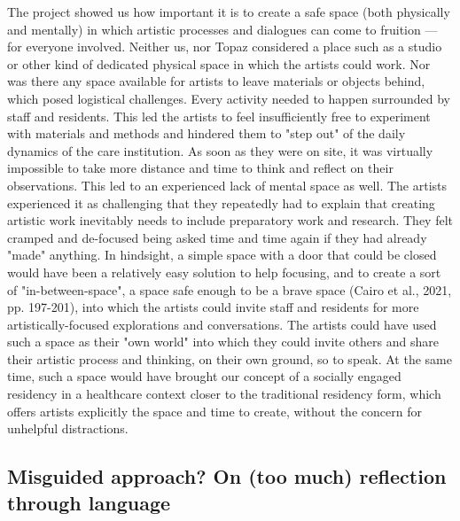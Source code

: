 \documentclass[authordate, empirical]{jote-new-article}
\begin{document}
	The project showed us how important it is to create a safe space (both physically and mentally) in which artistic processes and dialogues can come to fruition --- for everyone involved. Neither us, nor Topaz considered a place such as a studio or other kind of dedicated physical space in which the artists could work. Nor was there any space available for artists to leave materials or objects behind, which posed logistical challenges. Every activity needed to happen surrounded by staff and residents. This led the artists to feel insufficiently free to experiment with materials and methods and hindered them to "step out" of the daily dynamics of the care institution. As soon as they were on site, it was virtually impossible to take more distance and time to think and reflect on their observations. This led to an experienced lack of mental space as well. The artists experienced it as challenging that they repeatedly had to explain that creating artistic work inevitably needs to include preparatory work and research. They felt cramped and de-focused being asked time and time again if they had already "made" anything. In hindsight, a simple space with a door that could be closed would have been a relatively easy solution to help focusing, and to create a sort of "in-between-space", a space safe enough to be a brave space (Cairo et al., 2021, pp. 197-201), into which the artists could invite staff and residents for more artistically-focused explorations and conversations. The artists could have used such a space as their "own world" into which they could invite others and share their artistic process and thinking, on their own ground, so to speak. At the same time, such a space would have brought our concept of a socially engaged residency in a healthcare context closer to the traditional residency form, which offers artists explicitly the space and time to create, without the concern for unhelpful distractions.







	\subsection{Misguided approach? On (too much) reflection through language}
\end{document}
